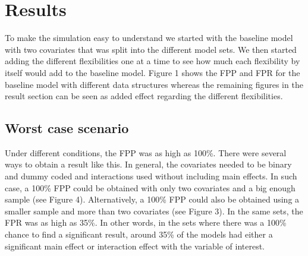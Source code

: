 \section{Results} 
To make the simulation easy to understand we started with the baseline model with two covariates that was split into the different model sets. We then started adding the different flexibilities one at a time to see how much each flexibility by itself would add to the baseline model. Figure 1 shows the FPP and FPR for the baseline model with different data structures whereas the remaining figures in the result section can be seen as added effect regarding the different flexibilities. 
\subsection{Worst case scenario}
Under different conditions, the FPP was as high as 100\%. There were several ways to obtain a result like this. In general, the covariates needed to be binary and dummy coded and interactions used without including main effects. In such case, a 100\% FPP could be obtained with only two covariates and a big enough sample (see Figure 4). Alternatively, a 100\% FPP could also be obtained using a smaller sample and more than two covariates (see Figure 3). In the same sets, the FPR was as high as 35\%. In other words, in the sets where there was a 100\% chance to find a significant result, around 35\% of the models had either a significant main effect or interaction effect with the variable of interest. 

